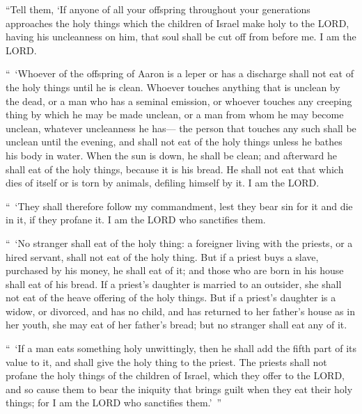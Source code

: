 \myverse{}“Tell them, ‘If anyone of all your offspring throughout your generations
approaches the holy things which the children of Israel make holy to the LORD, having his uncleanness
on him, that soul shall be cut off from before me. I am the LORD.


\myverse{}“ ‘Whoever of the offspring of Aaron is a leper or has a discharge
shall not eat of the holy things until he is clean. Whoever touches anything that is unclean by the dead,
or a man who has a seminal emission,
\myverse{}or whoever touches any creeping thing by which he may be made unclean, or a
man from whom he may become unclean, whatever uncleanness he has—
\myverse{}the person that touches any such shall be unclean until the evening, and shall
not eat of the holy things unless he bathes his body in water.
\myverse{}When the sun is down, he shall be clean; and afterward he shall eat of the
holy things, because it is his bread.
\myverse{}He shall not eat that which dies of itself or is torn by animals, defiling
himself by it. I am the LORD.


\myverse{}“ ‘They shall therefore follow my commandment, lest they bear sin
for it and die in it, if they profane it. I am the LORD who sanctifies them.


\myverse{}“ ‘No stranger shall eat of the holy thing: a foreigner living
with the priests, or a hired servant, shall not eat of the holy thing.
\myverse{}But if a priest buys a slave, purchased by his money, he shall eat of it;
and those who are born in his house shall eat of his bread.
\myverse{}If a priest’s daughter is married to an outsider, she shall not eat of the
heave offering of the holy things.
\myverse{}But if a priest’s daughter is a widow, or divorced, and has no child, and
has returned to her father’s house as in her youth, she may eat of her father’s bread; but no stranger
shall eat any of it.


\myverse{}“ ‘If a man eats something holy unwittingly, then he shall add
the fifth part of its value to it, and shall give the holy thing to the priest.
\myverse{}The priests shall not profane the holy things of the children of Israel,
which they offer to the LORD,
\myverse{}and so cause them to bear the iniquity that brings guilt when they eat their
holy things; for I am the LORD who sanctifies them.’ ”


